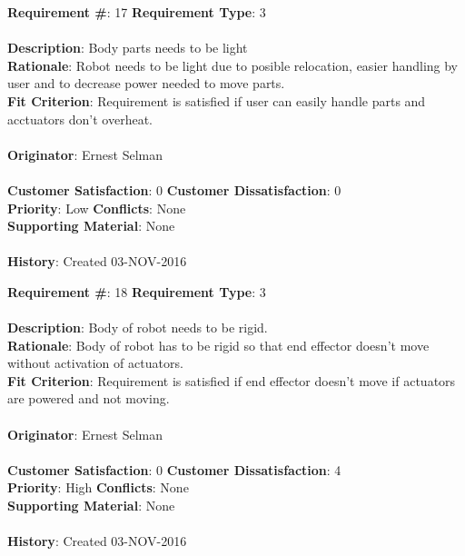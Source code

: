 \documentclass[titlepage]{article}
\begin{document}
\begin{framed}
	\noindent\textbf{Requirement \#}: 17 \hfill \textbf{Requirement Type}: 3 \hfill\\\\
	\noindent\textbf{Description}: Body parts needs to be light \\
	\textbf{Rationale}: Robot needs to be light due to posible relocation, easier handling by user and to decrease power needed to move parts. \\
	\textbf{Fit Criterion}: Requirement is satisfied if user can easily handle parts and acctuators don't overheat. \\\\
	\textbf{Originator}: Ernest Selman\\\\
	\noindent\textbf{Customer Satisfaction}: 0 \hfill 	\textbf{Customer Dissatisfaction}: 0 \hfill\\
	\textbf{Priority}: Low \hfill \textbf{Conflicts}: None \hfill\\
	\textbf{Supporting Material}: None\\\\
	\noindent\textbf{History}: Created 03-NOV-2016
\end{framed}

\begin{framed}
	\noindent\textbf{Requirement \#}: 18 \hfill \textbf{Requirement Type}: 3 \hfill\\\\
	\noindent\textbf{Description}: Body of robot needs to be rigid. \\
	\textbf{Rationale}: Body of robot has to be rigid so that end effector doesn't move without activation of actuators. \\
	\textbf{Fit Criterion}: Requirement is satisfied if end effector doesn't move if actuators are powered and not moving.\\\\
	\textbf{Originator}: Ernest Selman\\\\
	\noindent\textbf{Customer Satisfaction}: 0 \hfill 	\textbf{Customer Dissatisfaction}: 4 \hfill\\
	\textbf{Priority}: High \hfill \textbf{Conflicts}: None \hfill\\
	\textbf{Supporting Material}: None\\\\
	\noindent\textbf{History}: Created 03-NOV-2016
\end{framed}
\end{document}
